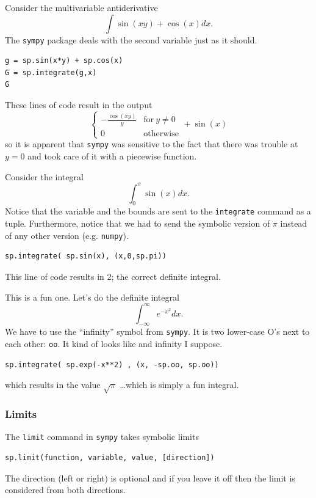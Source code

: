 \begin{example}
    Consider the multivariable antiderivative
    \[ \int \sin(xy) + \cos(x) dx.\]
    The \texttt{sympy} package deals with the second variable just as it should.  

\bcode
\begin{lstlisting}
g = sp.sin(x*y) + sp.cos(x)
G = sp.integrate(g,x) 
G 
\end{lstlisting}
These lines of code result in the output 
\[ \begin{cases} - \frac{\cos{\left(x y \right)}}{y} & \text{for}\: y \neq 0 \\0 & \text{otherwise} \end{cases} + \sin{\left(x \right)}  \]
so it is apparent that \texttt{sympy} was sensitive to the fact that there was trouble at
$y=0$ and took care of it with a piecewise function.

\end{example}

\begin{example}
    Consider the integral $$\int_0^\pi \sin(x) dx.$$
    Notice that the variable and the bounds are sent to the \texttt{integrate} command as
    a tuple.  Furthermore, notice that we had to send the symbolic version of $\pi$
    instead of any other version (e.g. \texttt{numpy}).

\bcode
\begin{lstlisting}
sp.integrate( sp.sin(x), (x,0,sp.pi))
\end{lstlisting}
This line of code results in $2$; the correct definite integral.
\end{example}

\begin{example}
    This is a fun one.  Let's do the definite integral
$$ \int_{-\infty}^\infty e^{-x^2} dx.$$
We have to use the ``infinity'' symbol from \texttt{sympy}.  It is two lower-case O's next
to each other: \texttt{oo}.  It kind of looks like and infinity I suppose.  

\bcode
\begin{lstlisting}
sp.integrate( sp.exp(-x**2) , (x, -sp.oo, sp.oo))
\end{lstlisting}
which results in the value $\sqrt{\pi}$ \ldots which is simply a fun integral.

\end{example}

\subsubsection{Limits}
The \texttt{limit} command in \texttt{sympy} takes symbolic limits
\begin{lstlisting}
sp.limit(function, variable, value, [direction])
\end{lstlisting}
The direction (left or right) is optional and if you leave it off then the limit is
considered from both directions.

